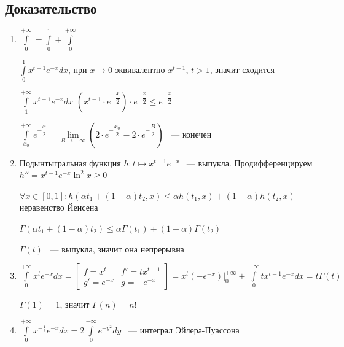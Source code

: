 \documentclass{article}
\begin{document}
        \subsection{Доказательство}
        
            \begin{enumerate}
            
                \item $\int\limits^{+\infty}_0 = \int\limits^1_0 + \int\limits^{+\infty}_0$
                
                    $\int\limits^1_0 x^{t - 1} e^{-x} dx$, при $x \rightarrow 0$ эквивалентно $x^{t - 1}$, $t > 1$, значит сходится
                    
                    $\int\limits^{+\infty}_1 x^{t - 1} e^{-x} dx$ $\left( x^{t - 1} \cdot e^{-\dfrac{x}{2}} \right) \cdot e^{-\dfrac{x}{2}} \leq e^{-\dfrac{x}{2}}$
                
                    $\int\limits^{+\infty}_{x_0} e^{-\dfrac{x}{2}} = \lim\limits_{B \rightarrow +\infty} \left(2 \cdot e^{-\dfrac{x_0}{2}} - 2 \cdot e^{-\dfrac{B}{2}} \right)$ ~--- конечен
                    
                \item Подынтыгральная функция $h : t \mapsto x^{t - 1} e^{-x}$ ~--- выпукла. Продифференцируем $h'' = x^{t - 1} e^{-x} \ln^2{x} \geq 0$
                
                    $\forall x \in [0, 1] :  h \left(\alpha t_1 + (1 - \alpha) t_2, x \right) \leq \alpha h(t_1, x) + (1 - \alpha) h(t_2, x)$ ~--- неравенство Йенсена
                    
                    $\Gamma(\alpha t_1 + (1 - \alpha) t_2) \leq \alpha \Gamma(t_1) + (1 - \alpha) \Gamma (t_2)$
                    
                    $\Gamma(t)$ ~--- выпукла, значит она непрерывна
                    
                \item $\int\limits^{+\infty}_0 x^t e^{-x} dx = \begin{bmatrix} f = x^t & f' = t x^{t - 1} \\ g' = e^{-x} & g = -e^{-x} \end{bmatrix} = x^t(-e^{-x}) \bigg|^{+\infty}_0 + \int\limits^{+\infty}_0 t x^{t - 1} e^{-x} dx = t \Gamma(t)$
                
                    $\Gamma(1) = 1$, значит $\Gamma(n) = n!$
                    
                \item $\int\limits^{+\infty}_0 x^{-\frac{1}{2}} e^{-x} dx = 2 \int\limits^{+\infty}_0 e^{-y^2} dy$ ~--- интеграл Эйлера-Пуассона
                
            \end{enumerate}
    
\end{document}
